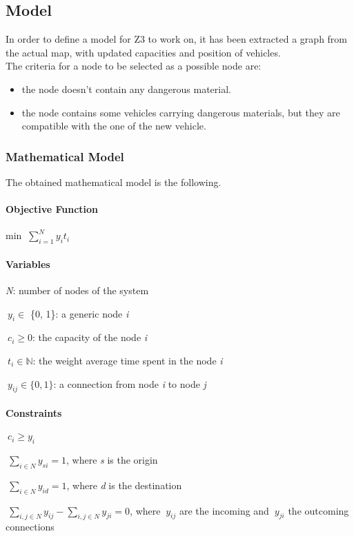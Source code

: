 
\subsection{Model}
In order to define a model for Z3 to work on, it has been extracted a graph from the actual map, with updated capacities and position of vehicles.\\
The criteria for a node to be selected as a possible node are:
\begin{itemize}
	\item the node doesn't contain any dangerous material.
	\item the node contains some vehicles carrying dangerous materials, but they are compatible with the one of the new vehicle.\\
\end{itemize}

\subsubsection{Mathematical Model}\label{Subs:MathModel}
The obtained mathematical model is the following.

\paragraph{Objective Function}
\begin{description}
	\item min $\ \sum_{i=1}^{N} y_{i}t_{i}$
\end{description}
\paragraph{Variables}
\begin{description}
	\item \textit{N}: number of nodes of the system
	\item $\ y_{i} \in$ \{0, 1\}: a generic node \textit{i}
	\item $\ c_{i} \geq 0$: the capacity of the node \textit{i}
	\item $\ t_{i} \in \mathbb{N}$: the weight average time spent in the node \textit{i}
	\item $\ y_{ij} \in \{0, 1\}$: a connection from node \textit{i} to node \textit{j}
\end{description}

\paragraph{Constraints}
\begin{description}
	\item $\ c_{i} \geq y_{i} $
	\item $\ \sum_{i \in N} y_{si} = 1$, where \textit{s} is the origin
	\item $\ \sum_{i \in N} y_{id} = 1$, where \textit{d} is the destination
	\item $\ \sum_{i,j \in N} y_{ij} - \sum_{i,j \in N} y_{ji} = 0$, where $\ y_{ij}$ are the incoming and $\ y_{ji}$ the outcoming connections
\end{description}


